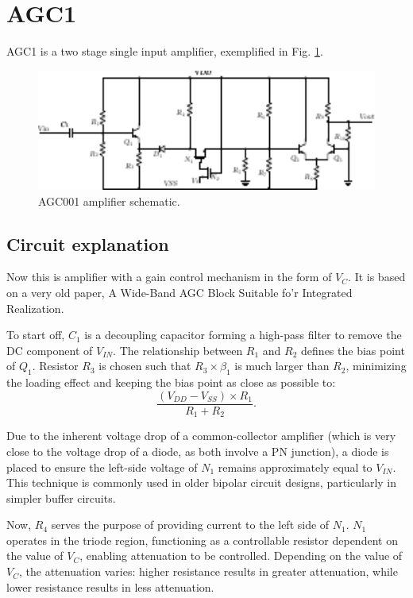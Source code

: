 \documentclass[12pt]{article}
\begin{document}
\newpage

\section{AGC1}

AGC1 is a  two stage single input amplifier, exemplified in Fig. \ref{audio004}. 
\begin{figure}[H]
        \centering
        \includegraphics[width=1\textwidth]{audio004.pdf}
        \caption{AGC001 amplifier schematic.}
        \label{audio004}
\end{figure}
\subsection{Circuit explanation}
Now this is amplifier with a gain control mechanism in the form of $V_C$. It is based on a very old paper, A Wide-Band AGC Block Suitable fo’r Integrated Realization. 

To start off, $C_1$ is a decoupling capacitor forming a high-pass filter to remove the DC component of $V_{IN}$. The relationship between $R_1$ and $R_2$ defines the bias point of $Q_1$. Resistor $R_3$ is chosen such that $R_3 \times \beta_1$ is much larger than $R_2$, minimizing the loading effect and keeping the bias point as close as possible to:  
\[
\frac{(V_{DD} - V_{SS}) \times R_1}{R_1 + R_2}.
\]  

Due to the inherent voltage drop of a common-collector amplifier (which is very close to the voltage drop of a diode, as both involve a PN junction), a diode is placed to ensure the left-side voltage of $N_1$ remains approximately equal to $V_{IN}$. This technique is commonly used in older bipolar circuit designs, particularly in simpler buffer circuits.

Now, $R_4$ serves the purpose of providing current to the left side of $N_1$. $N_1$ operates in the triode region, functioning as a controllable resistor dependent on the value of $V_C$, enabling attenuation to be controlled. Depending on the value of $V_C$, the attenuation varies: higher resistance results in greater attenuation, while lower resistance results in less attenuation.
\end{document}
